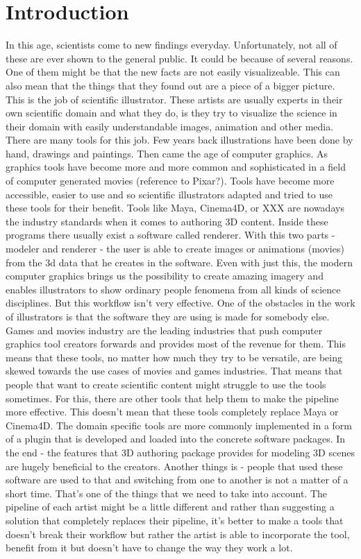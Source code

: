 \documentclass[
  digital, %
  table,   %
  lof,     %
  lot,     %
]{fithesis3}
\begin{document}
\chapter{Introduction}
In this age, scientists come to new findings everyday. Unfortunately, not all of these are ever shown to the general public. It could be because of several reasons. One of them might be that the new facts are not easily visualizeable. This can also mean that the things that they found out are a piece of a bigger picture.
This is the job of scientific illustrator. These artists are usually experts in their own scientific domain and what they do, is they try to visualize the science in their domain with easily understandable images, animation and other media.
There are many tools for this job. Few years back illustrations have been done by hand, drawings and paintings.
Then came the age of computer graphics. As graphics tools have become more and more common and sophisticated in a field of computer generated movies (reference to Pixar?). Tools have become more accessible, easier to use and so scientific illustrators adapted and tried to use these tools for their benefit. Tools like Maya, Cinema4D, or XXX are nowadays the industry standards when it comes to authoring 3D content. Inside these programs there usually exist a software called renderer. With this two parts - modeler and renderer - the user is able to create images or animations (movies) from the 3d data that he creates in the software.
Even with just this, the modern computer graphics brings us the possibility to create amazing imagery and enables illustrators to show ordinary people fenomena from all kinds of science disciplines.
But this workflow isn't very effective. One of the obstacles in the work of illustrators is that the software they are using is made for somebody else. Games and movies industry are the leading industries that push computer graphics tool creators forwards and provides most of the revenue for them. This means that these tools, no matter how much they try to be versatile, are being skewed towards the use cases of movies and games industries. That means that people that want to create scientific content might struggle to use the tools sometimes.
For this, there are other tools that help them to make the pipeline more effective. This doesn't mean that these tools completely replace Maya or Cinema4D. The domain specific tools are more commonly implemented in a form of a plugin that is developed and loaded into the concrete software packages.
In the end - the features that 3D authoring package provides for modeling 3D scenes are hugely beneficial to the creators. Another things is - people that used these software are used to that and switching from one to another is not a matter of a short time. That's one of the things that we need to take into account. The pipeline of each artist might be a little different and rather than suggesting a solution that completely replaces their pipeline, it's better to make a tools that doesn't break their workflow but rather the artist is able to incorporate the tool, benefit from it but doesn't have to change the way they work a lot.
\end{document}
